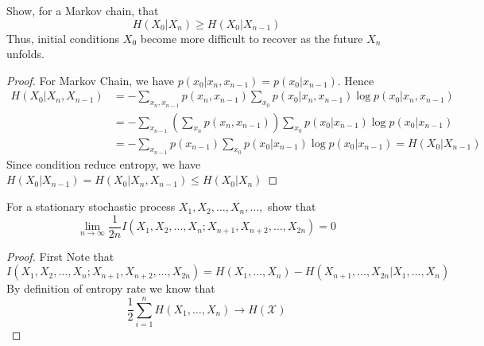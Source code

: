 \begin{exercise}{ Show, for a Markov chain, that
  $$
  H\left(X_{0} | X_{n}\right) \geq H\left(X_{0} | X_{n-1}\right)
  $$
  Thus, initial conditions $X_{0}$ become more difficult to recover as the future $X_{n}$ unfolds.}
  \begin{proof}
  For Markov Chain, we have $p(x_0|x_n,x_{n-1}) = p(x_0|x_{n-1})$. Hence
  \begin{equation}
    \begin{aligned}
      H(X_0|X_n,X_{n-1}) &= -\sum_{x_n,x_{n-1}} p(x_n,x_{n-1}) \sum_{x_0} p(x_0|x_n,x_{n-1}) \log    p(x_0|x_n,x_{n-1}) \\
      &= -\sum_{x_{n-1}} \left( \sum_{x_{n}} p(x_n,x_{n-1}) \right) \sum_{x_0} p(x_0|x_{n-1}) \log    p(x_0|x_{n-1})\\
      &= -\sum_{x_{n-1}} p(x_{n-1}) \sum_{x_0} p(x_0|x_{n-1}) \log    p(x_0|x_{n-1}) = H(X_0|X_{n-1})
    \end{aligned}
  \end{equation}
  Since condition reduce entropy, we have $  H(X_0|X_{n-1}) = H(X_0|X_n,X_{n-1}) \le  H(X_0|X_n) $
  \end{proof}
  \label{ex4-2}
\end{exercise}

\begin{exercise}{For a stationary stochastic process $X_{1}, X_{2}, \ldots, X_{n}, \ldots,$ show that
  $$
  \lim _{n \rightarrow \infty} \frac{1}{2 n} I\left(X_{1}, X_{2}, \ldots, X_{n} ; X_{n+1}, X_{n+2}, \ldots, X_{2 n}\right)=0
  $$}
  \begin{proof} First Note that
    \begin{equation}
      I\left(X_{1}, X_{2}, \ldots, X_{n} ; X_{n+1}, X_{n+2}, \ldots, X_{2 n}\right) = H(X_1,\ldots,X_n) - H(X_{n+1},\ldots,X_{2n}|X_1,\ldots,X_n)
    \end{equation}
    By definition of entropy rate we know that $$\frac{1}{2}\sum_{i=1}^{n} H(X_1,\ldots,X_n) \rightarrow H(\mathcal{X})$$



  \end{proof}
  \label{ex4-3}
\end{exercise}


